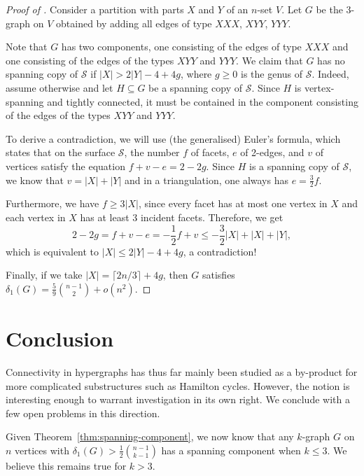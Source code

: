 \documentclass[12pt,reqno]{amsart}
\theoremstyle{plain}
\theoremstyle{definition}
\numberwithin{equation}{section}
\renewcommand{\subset}{\subseteq}
\newcommand{\cS}{\mathcal{S}}
\newcommand{\abs}[1]{\left\lvert#1\right\rvert}
\begin{document}
	\begin{proof}[Proof of ]
		Consider a partition with parts $X$ and $Y$ of an $n$-set $V$.
		Let $G$ be the $3$-graph on $V$ obtained by adding all edges of type $XXX$, $XYY$, $YYY$.
		
		Note that $G$ has two components, one consisting of the edges of type $XXX$ and one consisting of the edges of the types $XYY$ and $YYY$.
		We claim that $G$ has no spanning copy of $\cS$ if $|X| > 2|Y|-4 + 4g$, where $g\geq 0$ is the genus of $\cS$.
		Indeed, assume otherwise and let $H \subset G$ be a spanning copy of $\cS$. Since $H$ is vertex-spanning and tightly connected, it must be contained in the component consisting of the edges of the types $XYY$ and $YYY$.
		
		To derive a contradiction, we will use (the generalised) Euler's formula, which states that on the surface $\cS$, the number $f$ of facets, $e$ of 2-edges, and $v$ of vertices satisfy the equation $f+v-e=2-2g$. Since $H$ is a spanning copy of $\cS$, we know that $v=\abs {X}+\abs Y$ and in a triangulation, one always has $e=\frac{3}{2}f$. 
		
		Furthermore, we have $f\ge3\abs{X}$, since every facet has at most one vertex in $X$ and each vertex in $X$ has at least $3$ incident facets. Therefore, we get
		\[2 -2g=f+v-e=-\frac{1}{2}f+v\le -\frac{3}{2}\abs X+\abs X+\abs Y,\]
		which is equivalent to $\abs X\le 2\abs Y-4 +4g$, a contradiction!
		
		Finally, if we take $|X| = \lceil 2n/3\rceil + 4g$, then $G$ satisfies $\delta_1(G) = \tfrac{5}{9} \binom{n-1}{2}+o(n^2)$.
	\end{proof}
	
	
	
	
	


    
	\section{Conclusion}\label{s:conc}
	
	Connectivity in hypergraphs has thus far mainly been studied as a by-product for more complicated substructures such as Hamilton cycles.
	However, the notion is interesting enough to warrant investigation in its own right.
	We conclude with a few open problems in this direction.
	
	Given Theorem~\ref{thm:spanning-component}, we now know that any $k$-graph $G$ on $n$ vertices with $\delta_1(G) > \frac12\binom{n-1}{k-1}$ has a spanning component when $k \leq 3$. We believe this remains true for $k > 3$.
	
\end{document}
